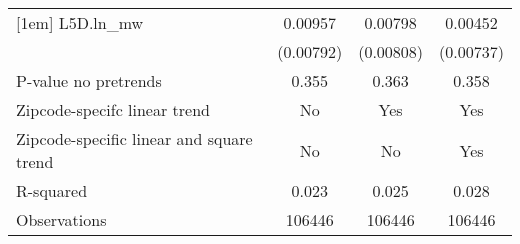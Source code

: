 {\begin{tabular}{l*{3}{c}}
[1em]
L5D.ln\_mw &  0.00957         &  0.00798         &  0.00452         \\
          &(0.00792)         &(0.00808)         &(0.00737)         \\
\hline
P-value no pretrends&    0.355         &    0.363         &    0.358         \\
Zipcode-specifc linear trend&       No         &      Yes         &      Yes         \\
Zipcode-specific linear and square trend&       No         &       No         &      Yes         \\
R-squared &    0.023         &    0.025         &    0.028         \\
Observations&   106446         &   106446         &   106446         \\
\hline\hline
\end{tabular}
}
